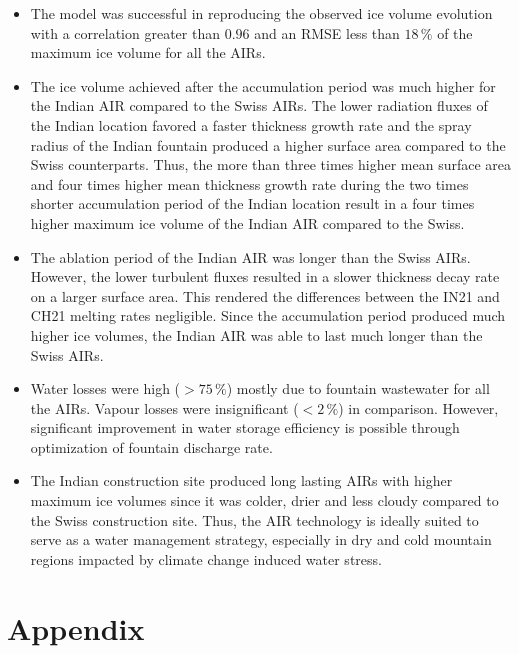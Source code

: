 \documentclass[utf8]{frontiersSCNS}
\begin{document}
\begin{itemize}
	\item The model was successful in reproducing the observed ice volume evolution with a correlation greater
	      than $0.96$ and an RMSE less than $18 \, \%$ of the maximum ice volume for all the AIRs.

	\item The ice volume achieved after the accumulation period was much higher for the Indian AIR compared to the
	      Swiss AIRs. The lower radiation fluxes of the Indian location favored a faster thickness growth rate and the
	      spray radius of the Indian fountain produced a higher surface area compared to the Swiss counterparts. Thus,
        the more than three times higher mean surface area and four times higher mean thickness growth rate
        during the two times shorter accumulation period of the Indian location result in a four times higher
        maximum ice volume of the Indian AIR compared to the Swiss.

	\item The ablation period of the Indian AIR was longer than the Swiss AIRs. However, the lower turbulent fluxes resulted in
	      a slower thickness decay rate on a larger surface area. This rendered the differences between the IN21 and CH21
	      melting rates negligible. Since the accumulation period produced much higher ice volumes, the Indian AIR was
	      able to last much longer than the Swiss AIRs.

	\item Water losses were high ($>75\,\%$) mostly due to fountain wastewater for all the AIRs. Vapour losses were
	      insignificant ($<2\,\%$) in comparison. However, significant improvement in water storage efficiency is possible
	      through optimization of fountain discharge rate.

  \item The Indian construction site produced long lasting AIRs with higher maximum ice volumes since it was
    colder, drier and less cloudy compared to the Swiss construction site. Thus, the AIR technology is ideally
    suited to serve as a water management strategy, especially in dry and cold mountain regions impacted by
    climate change induced water stress.

\end{itemize}

\section{Appendix}
\end{document}

